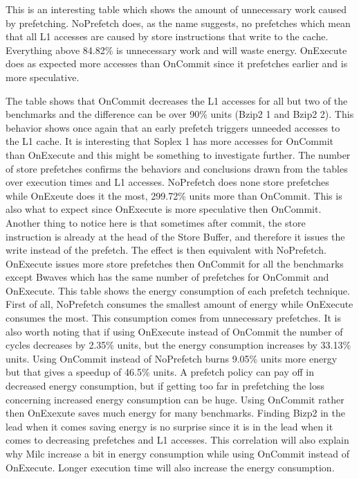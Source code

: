 This is an interesting table which shows the amount of unnecessary work caused
by prefetching. NoPrefetch does, as the name suggests, no prefetches which mean that
all L1 accesses are caused by store instructions that write to the cache. Everything
above 84.82\% is unnecessary work and will waste energy. OnExecute does as expected
more accesses than OnCommit since it prefetches earlier and is more speculative.

The table shows that OnCommit decreases the L1 accesses for all but two of
the benchmarks and the difference can be over 90\% units (Bzip2 1 and Bzip2 2).
This behavior shows once again that an early prefetch triggers unneeded accesses to
 the L1 cache. It is interesting that Soplex 1 has more accesses for OnCommit than
OnExecute and this might be something to investigate further.
\resSp
{}
The number of store prefetches confirms the behaviors and conclusions drawn from the tables over execution times and L1 accesses. NoPrefetch does none store prefetches
while OnExeute does it the most, 299.72\% units more than OnCommit. This is also
what to expect since OnExecute is more speculative then OnCommit. Another thing
to notice here is that sometimes after commit, the store instruction is already at the
head of the Store Buffer, and therefore it issues the write instead of the prefetch. The
effect is then equivalent with NoPrefetch.
OnExecute issues more store prefetches then OnCommit for all the benchmarks
except Bwaves which has the same number of prefetches for OnCommit and OnExecute.
\resEnergy
{}
This table shows the energy consumption of each prefetch technique. First of all,
NoPrefetch consumes the smallest amount of energy while OnExecute consumes the
most. This consumption comes from unnecessary prefetches. It is also worth noting
that if using OnExecute instead of OnCommit the number of cycles decreases by 2.35\%
units, but the energy consumption increases by 33.13\% units. Using OnCommit
instead of NoPrefetch burns 9.05\% units more energy but that gives a speedup of
46.5\% units. A prefetch policy can pay off in decreased energy consumption, but if getting too far in prefetching the loss concerning increased energy consumption can be huge.
Using OnCommit rather then OnExexute saves much energy for many benchmarks. Finding Bizp2 in the lead when it comes saving energy is no surprise since it is in the lead when it comes to decreasing prefetches and L1 accesses. This correlation will also explain why Milc increase a bit in energy consumption while using OnCommit instead of OnExecute. Longer execution time will also increase the energy consumption.



